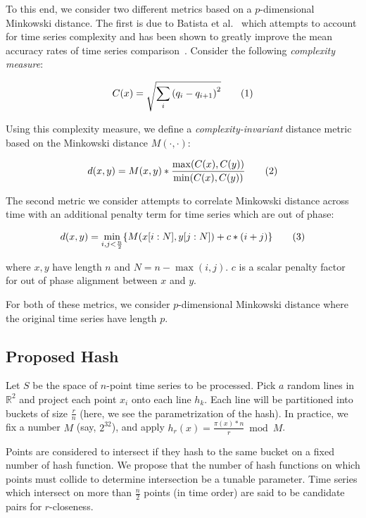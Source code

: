 \documentclass[a4paper]{article}
\newcommand\numberthis{\addtocounter{equation}{1}\tag{\theequation}}
\begin{document}
To this end, we consider two different metrics based on a $p$-dimensional Minkowski distance.
The first is due to Batista et al.~\cite{batista14-cid} which attempts to account for time series complexity and has been shown to greatly improve the mean accuracy rates of time series comparison~\cite{giusti13-ecd}.
Consider the following \textit{complexity measure}:

\begin{align*}
    C(x) = \sqrt{\sum\limits_i {(q_i - q_{i+1})}^2} \numberthis
\end{align*}

Using this complexity measure, we define a \textit{complexity-invariant} distance metric based on the Minkowski distance $M(\cdot,\cdot)$:

\begin{align*}
    d(x,y) = M(x,y) * \frac{\max(C(x),C(y))}{\min(C(x),C(y))} \numberthis
\end{align*}

The second metric we consider attempts to correlate Minkowski distance across time with an additional penalty term for time series which are out of phase:

\begin{align*}
    d(x,y) = \min\limits_{i,j<\frac{n}{2}} \{ M(x[i:N],y[j:N]) + c*(i+j) \} \numberthis \\
\end{align*}

where $x,y$ have length $n$ and $N = n - \max(i,j)$.
$c$ is a scalar penalty factor for out of phase alignment between $x$ and $y$.

For both of these metrics, we consider $p$-dimensional Minkowski distance where the original time series have length $p$.

\subsection{Proposed Hash}

Let $S$ be the space of $n$-point time series to be processed.
Pick $a$ random lines in $\mathbb{R}^2$ and project each point $x_i$ onto each line $h_k$.
Each line will be partitioned into buckets of size $\frac{r}{n}$ (here, we see the parametrization of the hash).
In practice, we fix a number $M$ (say, $2^{32}$), and apply $h_r(x) = \frac{\pi(x)*n}{r} \bmod M$. 

Points are considered to intersect if they hash to the same bucket on a fixed number of hash function.
We propose that the number of hash functions on which points must collide to determine intersection be a tunable parameter.
Time series which intersect on more than $\frac{n}{2}$ points (in time order) are said to be candidate pairs for $r$-closeness.
\end{document}
